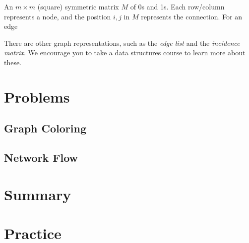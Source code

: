 \documentclass[main.tex]{subfiles}
\begin{document}
\begin{defn}
	An \(m \times m\) (square) symmetric matrix \(M\) of 0s and 1s. Each row/column represents a node, and the position \(i,j\) in \(M\) represents the connection. For an edge 
\end{defn}

\begin{defn}
	
\end{defn}

There are other graph representations, such as the \textit{edge list} and the \textit{incidence matrix}. We encourage you to take a data structures course to learn more about these.

\section{Problems}

\subsection{Graph Coloring}

\subsection{Network Flow}

\section{Summary}

\section{Practice}
\end{document}
